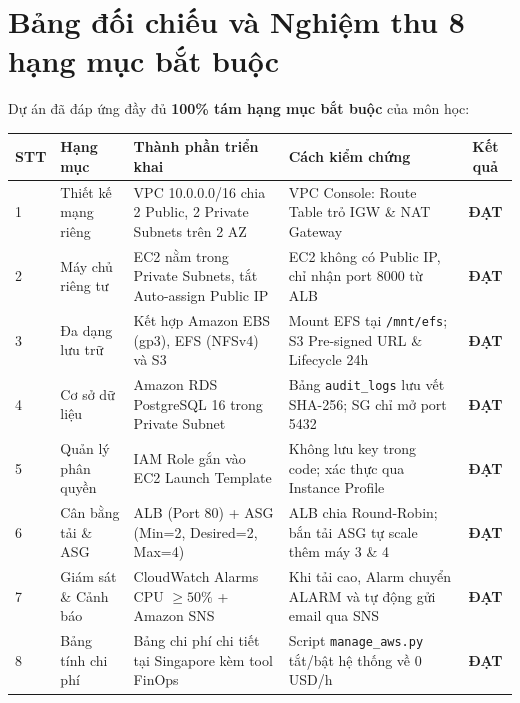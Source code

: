 \documentclass[12pt,a4paper]{report}
\begin{document}
\section{Bảng đối chiếu và Nghiệm thu 8 hạng mục bắt buộc}
Dự án đã đáp ứng đầy đủ \textbf{100\% tám hạng mục bắt buộc} của môn học:
\begin{table}[h!]
\centering
\small
\begin{tabular}{p{0.5cm}p{3.2cm}p{5.5cm}p{4cm}c}
\toprule
\textbf{STT} & \textbf{Hạng mục} & \textbf{Thành phần triển khai} & \textbf{Cách kiểm chứng} & \textbf{Kết quả} \\
\midrule
1 & Thiết kế mạng riêng & VPC 10.0.0.0/16 chia 2 Public, 2 Private Subnets trên 2 AZ & VPC Console: Route Table trỏ IGW \& NAT Gateway & \textbf{ĐẠT} \\
2 & Máy chủ riêng tư & EC2 nằm trong Private Subnets, tắt Auto-assign Public IP & EC2 không có Public IP, chỉ nhận port 8000 từ ALB & \textbf{ĐẠT} \\
3 & Đa dạng lưu trữ & Kết hợp Amazon EBS (gp3), EFS (NFSv4) và S3 & Mount EFS tại \texttt{/mnt/efs}; S3 Pre-signed URL \& Lifecycle 24h & \textbf{ĐẠT} \\
4 & Cơ sở dữ liệu & Amazon RDS PostgreSQL 16 trong Private Subnet & Bảng \texttt{audit\_logs} lưu vết SHA-256; SG chỉ mở port 5432 & \textbf{ĐẠT} \\
5 & Quản lý phân quyền & IAM Role gắn vào EC2 Launch Template & Không lưu key trong code; xác thực qua Instance Profile & \textbf{ĐẠT} \\
6 & Cân bằng tải \& ASG & ALB (Port 80) + ASG (Min=2, Desired=2, Max=4) & ALB chia Round-Robin; bắn tải ASG tự scale thêm máy 3 \& 4 & \textbf{ĐẠT} \\
7 & Giám sát \& Cảnh báo & CloudWatch Alarms CPU $\ge 50\%$ + Amazon SNS & Khi tải cao, Alarm chuyển ALARM và tự động gửi email qua SNS & \textbf{ĐẠT} \\
8 & Bảng tính chi phí & Bảng chi phí chi tiết tại Singapore kèm tool FinOps & Script \texttt{manage\_aws.py} tắt/bật hệ thống về 0 USD/h & \textbf{ĐẠT} \\
\bottomrule
\end{tabular}
\end{table}
\end{document}
